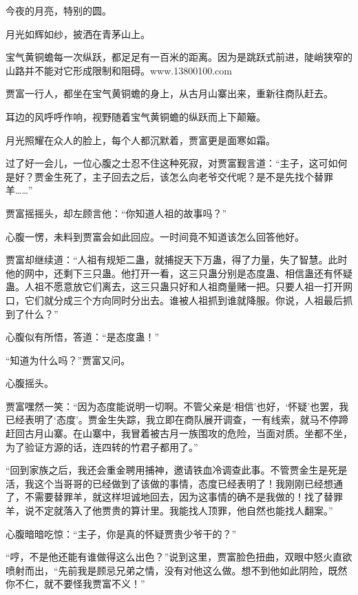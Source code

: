 
\begin{this_body}

今夜的月亮，特别的圆。

月光如辉如纱，披洒在青茅山上。

宝气黄铜蟾每一次纵跃，都足足有一百米的距离。因为是跳跃式前进，陡峭狭窄的山路并不能对它形成限制和阻碍。www.13800100.com

贾富一行人，都坐在宝气黄铜蟾的身上，从古月山寨出来，重新往商队赶去。

耳边的风呼呼作响，视野随着宝气黄铜蟾的纵跃而上下颠簸。

月光照耀在众人的脸上，每个人都沉默着，贾富更是面寒如霜。

过了好一会儿，一位心腹之士忍不住这种死寂，对贾富觐言道：“主子，这可如何是好？贾金生死了，主子回去之后，该怎么向老爷交代呢？是不是先找个替罪羊……”

贾富摇摇头，却左顾言他：“你知道人祖的故事吗？”

心腹一愣，未料到贾富会如此回应。一时间竟不知道该怎么回答他好。

贾富却继续道：“人祖有规矩二蛊，就捕捉天下万蛊，得了力量，失了智慧。此时他的网中，还剩下三只蛊。他打开一看，这三只蛊分别是态度蛊、相信蛊还有怀疑蛊。人祖不愿意放它们离去，这三只蛊只好和人祖商量赌一把。只要人祖一打开网口，它们就分成三个方向同时分出去。谁被人祖抓到谁就降服。你说，人祖最后抓到了什么？”

心腹似有所悟，答道：“是态度蛊！”

“知道为什么吗？”贾富又问。

心腹摇头。

贾富嘿然一笑：“因为态度能说明一切啊。不管父亲是‘相信’也好，‘怀疑’也罢，我已经表明了‘态度’。贾金生失踪，我立即在商队展开调查，一有线索，就马不停蹄赶回古月山寨。在山寨中，我冒着被古月一族围攻的危险，当面对质。坐都不坐，为了验证方源的话，连四转的竹君子都用了。”

“回到家族之后，我还会重金聘用捕神，邀请铁血冷调查此事。不管贾金生是死是活，我这个当哥哥的已经做到了该做的事情，态度已经表明了！我刚刚已经想通了，不需要替罪羊，就这样坦诚地回去，因为这事情的确不是我做的！找了替罪羊，说不定就落入了他贾贵的算计里。我能找人顶罪，他自然也能找人翻案。”

心腹暗暗吃惊：“主子，你是真的怀疑贾贵少爷干的？”

“哼，不是他还能有谁做得这么出色？”说到这里，贾富脸色扭曲，双眼中怒火直欲喷射而出，“先前我是顾忌兄弟之情，没有对他这么做。想不到他如此阴险，既然你不仁，就不要怪我贾富不义！”


\end{this_body}
